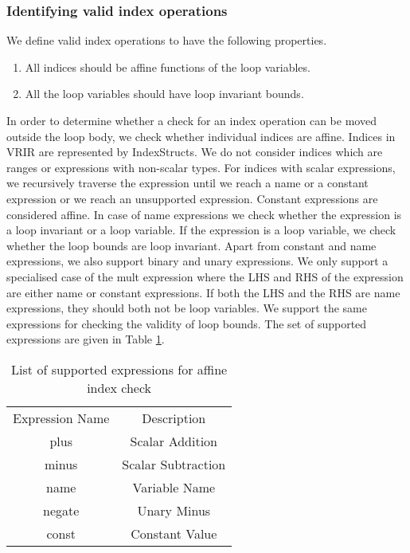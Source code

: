 \subsubsection{Identifying valid index operations}
We define valid index operations to have the following properties. 
\begin{enumerate}
\item All indices should be affine functions of the loop variables. 
\item All the loop variables should have loop invariant bounds. 
\end{enumerate}
In order to determine whether a check for an index operation can be moved outside the loop body, we check whether individual indices are affine. Indices in VRIR are represented by IndexStructs. We do not consider indices which are ranges or expressions with non-scalar types. For indices with scalar expressions, we recursively traverse the expression until we reach a name or a constant expression or we reach an unsupported expression. Constant expressions are considered affine. In  case of name expressions we check whether the expression is a loop invariant or a loop variable. If the expression is a loop variable, we check whether the loop bounds are loop invariant. Apart from constant and name expressions, we also support binary and unary expressions. We only support a specialised case of the mult expression where the LHS and RHS  of the expression are either name or constant expressions. If both the LHS and the RHS are name expressions, they should both not be loop variables. We support the same expressions for checking the validity of loop bounds. The set of supported expressions are given in Table \ref{tab:affineIndexCheck}. 
\begin{table}[htbp]
\centering
\begin{tabular}{|c|c|}
\hline
Expression Name & Description        \\ \hhline{|=|=|}
plus            & Scalar Addition    \\ \hline
minus           & Scalar Subtraction \\ \hline
name            & Variable Name      \\ \hline
negate          & Unary Minus        \\ \hline
const           & Constant Value     \\ \hline
\end{tabular}
\caption{List of supported expressions for affine index check}
\label{tab:affineIndexCheck}
\end{table} 
